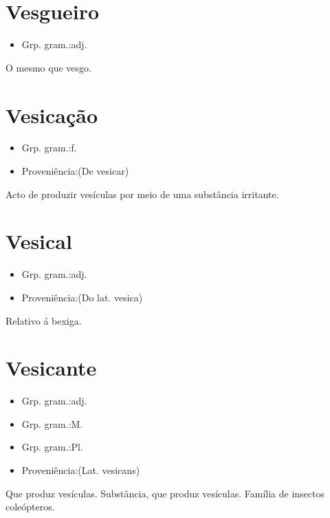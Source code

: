 \documentclass{article}
\begin{document}
\section{Vesgueiro}
\begin{itemize}
\item {Grp. gram.:adj.}
\end{itemize}
O mesmo que \textunderscore vesgo\textunderscore .
\section{Vesicação}
\begin{itemize}
\item {Grp. gram.:f.}
\end{itemize}
\begin{itemize}
\item {Proveniência:(De \textunderscore vesicar\textunderscore )}
\end{itemize}
Acto de produzir vesículas por meio de uma substância irritante.
\section{Vesical}
\begin{itemize}
\item {Grp. gram.:adj.}
\end{itemize}
\begin{itemize}
\item {Proveniência:(Do lat. \textunderscore vesica\textunderscore )}
\end{itemize}
Relativo á bexiga.
\section{Vesicante}
\begin{itemize}
\item {Grp. gram.:adj.}
\end{itemize}
\begin{itemize}
\item {Grp. gram.:M.}
\end{itemize}
\begin{itemize}
\item {Grp. gram.:Pl.}
\end{itemize}
\begin{itemize}
\item {Proveniência:(Lat. \textunderscore vesicans\textunderscore )}
\end{itemize}
Que produz vesículas.
Substância, que produz vesículas.
Família de insectos coleópteros.
\end{document}

